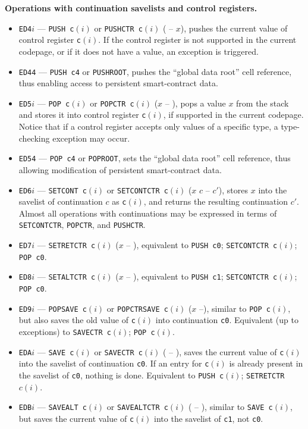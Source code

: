 \documentclass[12pt,oneside]{article}
\def\makepoint#1{\medbreak\noindent{\bf #1.\ }}
\def\nxsubpoint{\refstepcounter{subsubsection}%
    \smallbreak\makepoint{\thesubsubsection}}
\def\emb#1{\textbf{#1.}}
\begin{document}
\nxsubpoint\emb{Operations with continuation savelists and control registers}
\begin{itemize}
\item {\tt ED4$i$} --- {\tt PUSH c$(i)$} or {\tt PUSHCTR c$(i)$} ( -- $x$), pushes the current value of control register {\tt c$(i)$}. If the control register is not supported in the current codepage, or if it does not have a value, an exception is triggered.
\item {\tt ED44} --- {\tt PUSH c4} or {\tt PUSHROOT}, pushes the ``global data root'' cell reference, thus enabling access to persistent smart-contract data.
\item {\tt ED5$i$} --- {\tt POP c$(i)$} or {\tt POPCTR c$(i)$} ($x$ -- ), pops a value $x$ from the stack and stores it into control register {\tt c$(i)$}, if supported in the current codepage. Notice that if a control register accepts only values of a specific type, a type-checking exception may occur.
\item {\tt ED54} --- {\tt POP c4} or {\tt POPROOT}, sets the ``global data root'' cell reference, thus allowing modification of persistent smart-contract data.
\item {\tt ED6$i$} --- {\tt SETCONT c$(i)$} or {\tt SETCONTCTR c$(i)$} ($x$ $c$ -- $c'$), stores $x$ into the savelist of continuation $c$ as {\tt c$(i)$}, and returns the resulting continuation $c'$. Almost all operations with continuations may be expressed in terms of {\tt SETCONTCTR}, {\tt POPCTR}, and {\tt PUSHCTR}.
\item {\tt ED7$i$} --- {\tt SETRETCTR c$(i)$} ($x$ -- ), equivalent to {\tt PUSH c0}; {\tt SETCONTCTR c$(i)$}; {\tt POP c0}.
\item {\tt ED8$i$} --- {\tt SETALTCTR c$(i)$} ($x$ -- ), equivalent to {\tt PUSH c1}; {\tt SETCONTCTR c$(i)$}; {\tt POP c0}.
\item {\tt ED9$i$} --- {\tt POPSAVE c$(i)$} or {\tt POPCTRSAVE c$(i)$} ($x$ --), similar to {\tt POP c$(i)$}, but also saves the old value of {\tt c$(i)$} into continuation {\tt c0}. Equivalent (up to exceptions) to {\tt SAVECTR c$(i)$}; {\tt POP c$(i)$}.
\item {\tt EDA$i$} --- {\tt SAVE c$(i)$} or {\tt SAVECTR c$(i)$} ( -- ), saves the current value of {\tt c$(i)$} into the savelist of continuation {\tt c0}. If an entry for {\tt c$(i)$} is already present in the savelist of {\tt c0}, nothing is done. Equivalent to {\tt PUSH c$(i)$}; {\tt SETRETCTR $c(i)$}.
\item {\tt EDB$i$} --- {\tt SAVEALT c$(i)$} or {\tt SAVEALTCTR c$(i)$} ( -- ), similar to {\tt SAVE c$(i)$}, but saves the current value of {\tt c$(i)$} into the savelist of {\tt c1}, not {\tt c0}.

\end{itemize}
\end{document}
